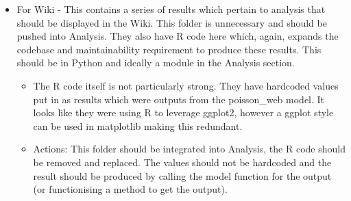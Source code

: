 \documentclass{scrreprt}
\begin{document}
\begin{itemize}
\begin{itemize}
		\end{itemize}
	\item For Wiki - This contains a series of results which pertain to analysis that should be displayed in the Wiki. This folder is unnecessary and should be pushed into Analysis. They also have R code here which, again, expands the codebase and maintainability requirement to produce these results. This should be in Python and ideally a module in the Analysis section.
		\begin{itemize}
			\item The R code itself is not particularly strong. They have hardcoded values put in as results which were outputs from the poisson\_web model. It looks like they were using R to leverage ggplot2, however a ggplot style can be used in matplotlib making this redundant.
			\item Actions: This folder should be integrated into Analysis, the R code should be removed and replaced. The values should not be hardcoded and the result should be produced by calling the model function for the output (or functionising a method to get the output).
		\end{itemize}

\end{itemize}
\end{document}
